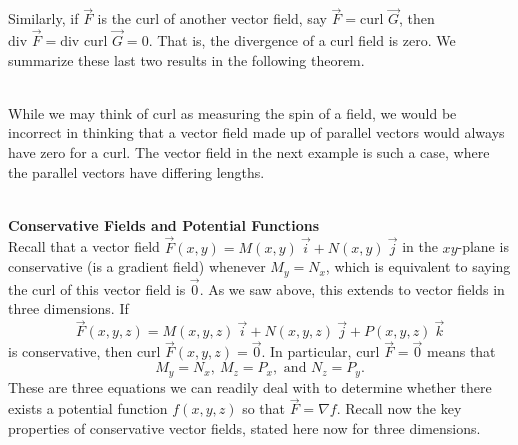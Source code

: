 Similarly, if $\vec F$ is the curl of another vector field, say $\vec F = \text{curl } \vec G$, then $\text{div } \vec F = \text{div } \text{curl } \vec G = 0$.  That is, the divergence of a curl field is zero.  We summarize these last two results in the following theorem.

\\

While we may think of curl as measuring the spin of a field, we would be incorrect in thinking that a vector field made up of parallel vectors would always have zero for a curl.  The vector field in the next example is such a case, where the parallel vectors have differing lengths.\\


\\

\noindent\textbf{\large Conservative Fields and Potential Functions}\\

Recall that a vector field $\vec F(x,y) = M(x,y) \: \vec i + N(x,y) \: \vec j$ in the $xy$-plane is conservative (is a gradient field) whenever $M_y = N_x$, which is equivalent to saying the curl of this vector field is $\vec 0$.  As we saw above, this extends to vector fields in three dimensions.  If $$\vec F(x,y,z) = M(x,y,z) \: \vec i + N(x,y,z) \: \vec j + P(x,y,z) \: \vec k$$ is conservative, then $\text{curl } \vec F(x,y,z) = \vec 0$.  In particular, $\text{curl } \vec F = \vec 0$ means that
$$M_y = N_x, \: M_z = P_x, \text{ and } N_z = P_y.$$
These are three equations we can readily deal with to determine whether there exists a potential function $f(x,y,z)$ so that $\vec F = \nabla f$.  Recall now the key properties of conservative vector fields, stated here now for three dimensions.\\

